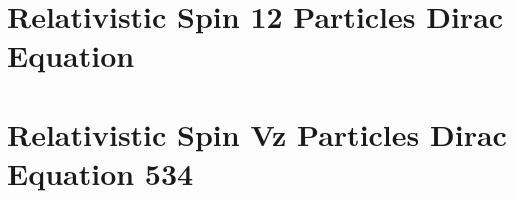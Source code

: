 \documentclass[11pt,twoside,openright]{book}
\begin{document}
\chapter{Relativistic Spin 12 Particles Dirac Equation}

\chapter{Relativistic Spin Vz Particles Dirac Equation 534}














\end{document}
